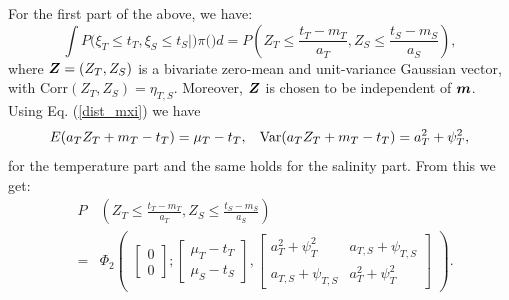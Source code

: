 \documentclass[aoas]{imsart}
\begin{document}
For the first part of the above, we have:
\begin{equation}\label{part1:phi2}
 \int P(\xi_T \leq t_T, \xi_S \leq t_S|\bm) \pi(\bm) d\bm= 
P \left( Z_{T} \leq \frac{t_T-m_{T}}{a_{T}}, 
Z_{S} \leq \frac{t_S-m_{S}}{a_{S}} \right), \nonumber
\end{equation}
where ${\boldsymbol Z}=(Z_{T},Z_{S})$ is a bivariate zero-mean and unit-variance
Gaussian vector, with $\mbox{Corr}(Z_{T},Z_{S})=\eta_{T,S}$. Moreover,
${\boldsymbol Z}$ is chosen to be independent of ${\boldsymbol m}$. Using Eq. (\ref{dist_mxi}) we have
\begin{equation}
    E(a_{T} Z_{T}+m_{T}-t_T) = \mu_{T}-t_T, \hspace{3mm}
    \mbox{Var}(a_{T} Z_{T}+m_{T}-t_T) = a^2_T+ \psi^2_{T}, 
\end{equation}
for the temperature part and the same holds for the salinity part. From this we get:
\begin{eqnarray}\label{two_parts0}
& P & \left( Z_{T} \leq \frac{t_T-m_{T}}{a_{T}}, 
Z_{S} \leq \frac{t_S-m_{S}}{a_{S}} \right) \\
&=& \Phi_2 \begin{pmatrix} 
\begin{bmatrix} 0\\
0
\end{bmatrix};
\begin{bmatrix} \mu_{T}-t_T\\
\mu_{S}-t_S
\end{bmatrix},\begin{bmatrix}
a^2_T+ \psi^2_{T} & a_{T,S}+\psi_{T,S}  \\
a_{T,S}+\psi_{T,S}   & a^2_T+ \psi^2_{T} 
\end{bmatrix}\end{pmatrix} \nonumber.
\end{eqnarray}
\end{document}
